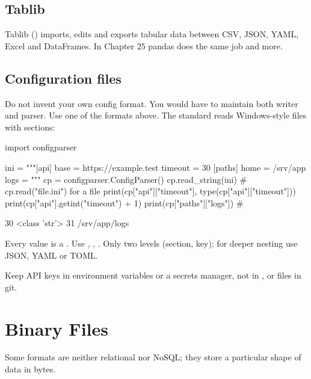 \subsection{Tablib}

Tablib () imports, edits and exports tabular data between CSV,
JSON, YAML, Excel and DataFrames. In Chapter 25 pandas does the same job and more.

\subsection{Configuration files}

Do not invent your own config format. You would have to maintain both writer and parser.
Use one of the formats above. The standard  reads Windows-style
 files with sections:

\begin{pycode}
import configparser

ini = """[api]
base = https://example.test
timeout = 30
[paths]
home = /srv/app
logs = %
"""
cp = configparser.ConfigParser()
cp.read_string(ini)                     # cp.read("file.ini") for a file
print(cp["api"]["timeout"], type(cp["api"]["timeout"]))
print(cp["api"].getint("timeout") + 1)
print(cp["paths"]["logs"])              # %
\end{pycode}
\begin{rawcode}
30 <class 'str'>
31
/srv/app/logs
\end{rawcode}

\begin{typecheck}
Every  value is a . Use , ,
. Only two levels (section, key); for deeper nesting use JSON, YAML or
TOML.
\end{typecheck}

\begin{gamerule}
Keep API keys in environment variables or a secrets manager, not in ,
 or  files in git.
\end{gamerule}

\section{Binary Files}

Some formats are neither relational nor NoSQL; they store a particular shape of data in
bytes.

